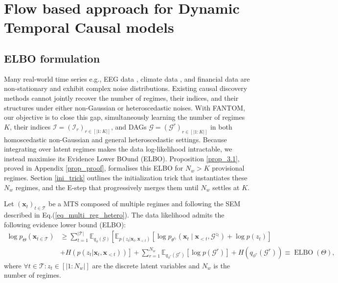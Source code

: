 
\section{Flow based approach for Dynamic Temporal Causal models}\label{sec:algorithm}
\subsection{ELBO formulation}
Many real-world time series e.g., EEG data \citep{huizenga1995equivalent, rahmani2023meta}, climate data \citep{karmouche2023regime, gunther2022conditional}, and financial data \citep{hamilton1994autoregressive} are non-stationary and exhibit complex noise distributions. Existing causal discovery methods cannot jointly recover the number of regimes, their indices, and their structures under either non-Gaussian or heteroscedastic noises. With FANTOM, our objective is to close this gap, simultaneously learning the number of regimes $K$, their indices $\mathcal{I} = (\mathcal{I}_r)_{r \in [|1:K|]}$, and DAGs $\boldsymbol{\mathcal{G}} = (\mathcal{G}^r)_{r \in [|1:K|]}$ in both homoscedastic non-Gaussian and general heteroscedastic settings. Because integrating over latent regimes makes the data log-likelihood intractable, we instead maximise its Evidence Lower BOund (ELBO). Proposition \ref{prop_3.1}, proved in Appendix \ref{prop_proof}, formalises this ELBO for $N_w>K$ provisional regimes. Section \ref{ini_trick} outlines the initialization trick that instantiates these $N_w$ regimes, and the E-step that progressively merges them until $N_w$ settles at $K$.
\begin{mybox}\begin{proposition}
\label{prop_3.1}
Let $(\boldsymbol{x}_t)_{t \in \mathcal{T}}$ be a MTS composed of multiple regimes and following the SEM described in Eq.(\ref{eq_multi_reg_hetero}). The data likelihood admits the following evidence lower bound (ELBO):
\begin{equation}
  \begin{aligned}
\log p_\Theta\left(\boldsymbol{x}_{t \in \mathcal{T}}\right) 
& \geq \sum_{t=1}^{|\mathcal{T}|}\mathbb{E}_{q_\phi\left(\mathcal{G}\right)}\left[\mathbb{E}_{ p( z_t | \boldsymbol{x}_t, \boldsymbol{x}_{<t}) } \left[\log p_{\theta^{z_t}}\left(\boldsymbol{x}_t\mid \boldsymbol{x}_{<t}, \mathcal{G}^{z_t}\right)+\log p\left(z_t\right)\right] \right. \\ %
 & \left. + H\left(p( z_t | \boldsymbol{x}_t, \boldsymbol{x}_{<t})\right)\right] +\sum_{r=1}^{N_w} \mathbb{E}_{q_{\phi^r}\left(\mathcal{G}^r\right)}\left[\log p\left(\mathcal{G}^r\right)\right]+H\left(q_{\phi^r}\left(\mathcal{G}^r\right)\right) \equiv \operatorname{ELBO}(\Theta), %
\end{aligned} 
\label{elbo_eq}
\end{equation}
where $\forall t \in \mathcal{T}: z_t \in [|1:N_w|]$ are the discrete latent variables and $N_w$ is the number of regimes. 
\end{proposition}\end{mybox}
